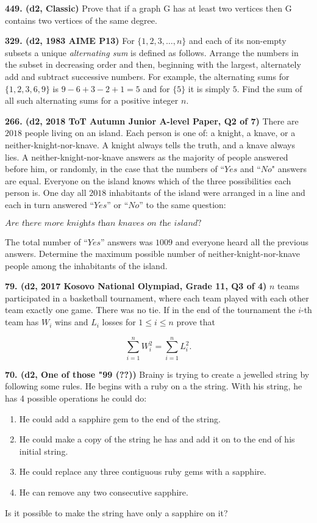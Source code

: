 \documentclass{article}
\begin{document}
        \textbf{449. (\color{red}d2\color{black}, Classic)} Prove that if a graph G has at least two vertices then G contains two vertices of the same degree.

        \textbf{329. (\color{red}d2\color{black}, 1983 AIME P13)} For $\{1,2,3,\dots, n\}$ and each of its non-empty subsets a unique \emph{alternating sum} is defined as follows. Arrange the numbers in the subset in decreasing order and then, beginning with the largest, alternately add and subtract successive numbers. For example, the alternating sums for $\{1,2,3,6,9\}$ is $9-6+3-2+1=5$ and for $\{5\}$ it is simply $5$. Find the sum of all such alternating sums for a positive integer $n$.

        \textbf{266. (\color{red}d2\color{black}, 2018 ToT Autumn Junior A-level Paper, Q2 of 7)} There are $2018$ people living on an island. Each person is one of: a knight, a knave, or a neither-knight-nor-knave. A knight always tells the truth, and a knave always lies. A neither-knight-nor-knave answers as the majority of people answered before him, or randomly, in the case that the numbers of $\textit{“Yes}$ and $\textit{“No"}$ answers are equal. Everyone on the island knows which of the three possibilities each person is. One day all $2018$ inhabitants of the island were arranged in a line and each in turn answered $\textit{“Yes”}$ or $\textit{“No”}$ to the same question:
        \begin{center} $\textit{Are there more knights than knaves on the island?}$ \end{center}
        The total number of $\textit{“Yes”}$ answers was $1009$ and everyone heard all the previous answers. Determine the maximum possible number of neither-knight-nor-knave people among the inhabitants of the island.

        \textbf{79. (\color{red}d2\color{black}, 2017 Kosovo National Olympiad, Grade 11, Q3 of 4)} \(n\) teams participated in a basketball tournament, where each team played with each other team exactly one game. There was no tie. If in the end of the tournament the \(i\)-th team has \(W_i\) wins and \(L_i\) losses for \(1 \leq i \leq n\) prove that

        \[\displaystyle \sum_{i=1}^n W_i^2 = \displaystyle \sum_{i=1}^n L_i^2.\]

        \textbf{70. (\color{red}d2\color{black}, One of those "99%
                (??))} Brainy is trying to create a jewelled string by following some rules. He begins with a ruby on a the string. With his string, he has 4 possible operations he could do:
        \begin{enumerate}
                \item He could add a sapphire gem to the end of the string.
                \item He could make a copy of the string he has and add it on to the end of his initial string.
                \item He could replace any three contiguous ruby gems with a sapphire.
                \item He can remove any two consecutive sapphire.
        \end{enumerate}
        Is it possible to make the string have only a sapphire on it?
\end{document}
